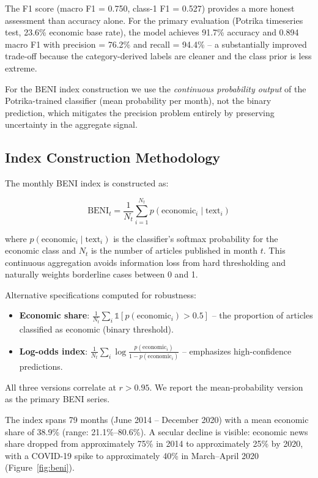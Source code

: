 \documentclass[11pt]{article}
\begin{document}
The F1 score (macro F1 = 0.750, class-1 F1 = 0.527) provides a more honest assessment than accuracy alone. For the primary evaluation (Potrika timeseries test, 23.6\% economic base rate), the model achieves 91.7\% accuracy and 0.894 macro F1 with precision = 76.2\% and recall = 94.4\% -- a substantially improved trade-off because the category-derived labels are cleaner and the class prior is less extreme.

For the BENI index construction we use the \emph{continuous probability output} of the Potrika-trained classifier (mean probability per month), not the binary prediction, which mitigates the precision problem entirely by preserving uncertainty in the aggregate signal.

\subsection{Index Construction Methodology}

The monthly BENI index is constructed as:

\[
\text{BENI}_t = \frac{1}{N_t} \sum_{i=1}^{N_t} p(\text{economic}_i \mid \text{text}_i)
\]

where \(p(\text{economic}_i \mid \text{text}_i)\) is the classifier's softmax probability for the economic class and \(N_t\) is the number of articles published in month \(t\). This continuous aggregation avoids information loss from hard thresholding and naturally weights borderline cases between 0 and 1.

Alternative specifications computed for robustness:
\begin{itemize}
\item \textbf{Economic share}: \(\frac{1}{N_t} \sum_i \mathbb{1}[p(\text{economic}_i) > 0.5]\) -- the proportion of articles classified as economic (binary threshold).
\item \textbf{Log-odds index}: \(\frac{1}{N_t} \sum_i \log \frac{p(\text{economic}_i)}{1 - p(\text{economic}_i)}\) -- emphasizes high-confidence predictions.
\end{itemize}
All three versions correlate at \(r > 0.95\). We report the mean-probability version as the primary BENI series.

The index spans 79 months (June 2014 -- December 2020) with a mean economic share of 38.9\% (range: 21.1\%--80.6\%). A secular decline is visible: economic news share dropped from approximately 75\% in 2014 to approximately 25\% by 2020, with a COVID-19 spike to approximately 40\% in March--April 2020 (Figure~\ref{fig:beni}). 
\end{document}
